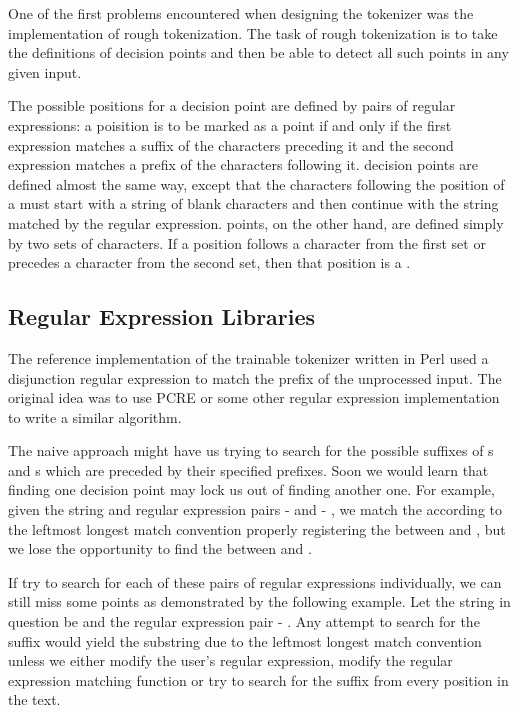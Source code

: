 One of the first problems encountered when designing the tokenizer was the
implementation of rough tokenization. The task of rough tokenization is to take
the definitions of decision points and then be able to detect all such points
in any given input.

The possible positions for a \maysplit{} decision point are defined by pairs of
regular expressions: a poisition is to be marked as a \maysplit{} point if and
only if the first expression matches a suffix of the characters preceding it
and the second expression matches a prefix of the characters following it.
\mayjoin{} decision points are defined almost the same way, except that the
characters following the position of a \mayjoin{} must start with a string of
blank characters and then continue with the string matched by the regular
expression. \maybreaksentence{} points, on the other hand, are defined simply
by two sets of characters. If a position follows a character from the first set
or precedes a character from the second set, then that position is a
\maybreaksentence{}.

\subsection{Regular Expression Libraries}
\label{ssec:impl-roughtok-regex}

The reference implementation of the trainable tokenizer written in Perl used a
disjunction regular expression to match the prefix of the unprocessed input.
The original idea was to use PCRE or some other regular expression
implementation to write a similar algorithm.

The naive approach might have us trying to search for the possible suffixes of
\mayjoin{}s and \maysplit{}s which are preceded by their specified prefixes.
Soon we would learn that finding one decision point may lock us out of finding
another one. For example, given the string  and \maysplit{}
regular expression pairs  -  and  -
, we match the  according to the leftmost longest match
convention properly registering the \maysplit{} between  and
, but we lose the opportunity to find the \maysplit{} between
 and .

If try to search for each of these pairs of regular expressions individually,
we can still miss some points as demonstrated by the following example. Let the
string in question be  and the \maysplit{} regular expression
pair  - . Any attempt to search for the suffix
 would yield the  substring due to the leftmost
longest match convention unless we either modify the user's regular expression,
modify the regular expression matching function or try to search for the suffix
from every position in the text.

